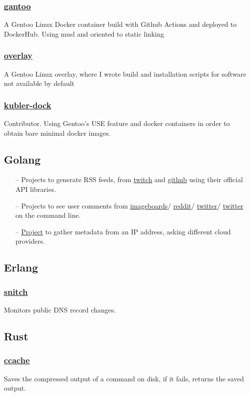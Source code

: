 \documentclass[11pt]{article}
\newcommand{\git}[2]{\href {https://github.com/azimut/{#2}} {#1}}
\begin{document}
\subsubsection{\git{gantoo}{gantoo}}
A Gentoo Linux Docker container build with Github Actions and deployed to DockerHub. Using musl and oriented to static linking
\subsubsection{\git{overlay}{overlay}}
A Gentoo Linux overlay, where I wrote build and installation scripts for software not available by default
\subsubsection{\git{kubler-dock}{kubler-dock}}
Contributor. Using Gentoo's USE feature and docker containers in order to obtain bare minimal docker images.

\subsection{Golang}
\begin{itemize}
  \setlength{\parskip}{0pt}
  \setlength{\itemsep}{0pt plus 1pt}
  \item[--] Projects to generate RSS feeds, from \git{twitch}{twitch-rss} and \git{github}{github-rss} using their official API libraries.
  \item[--] Projects to see user comments from
    \git{imageboards}{lainviewer}/
    \git{reddit}{redditviewer}/
    \git{twitter}{cli-view}/
    \git{twitter}{cli-view} on the command line.
  \item[--] \git{Project}{sunny} to gather metadata from an IP address, asking different cloud providers.
\end{itemize}

\subsection{Erlang}
\subsubsection{\git{snitch}{snitch}}
Monitors public DNS record changes.

\subsection{Rust}
\subsubsection{\git{ccache}{ccache}}
Saves the compressed output of a command on disk, if it fails, returns the saved output.
\end{document}
